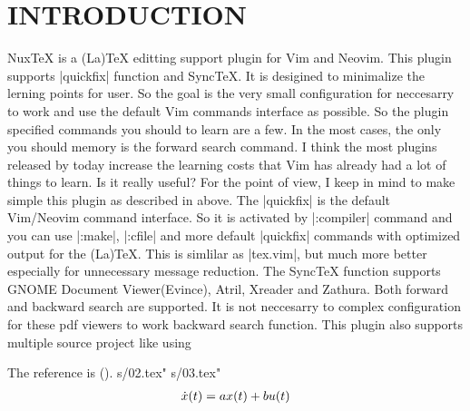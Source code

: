 \section{INTRODUCTION}

NuxTeX is a (La)TeX editting support plugin for Vim and Neovim. This plugin supports |quickfix| function and SyncTeX. It is desigined to minimalize the lerning points for user. So the goal is the very small configuration for neccesarry to work and use the default Vim commands interface as possible.  So the plugin specified commands you should to learn are a few. In the most cases, the only you should memory is the forward search command.
I think the most plugins released by today increase the learning costs that Vim has already had a lot of things to learn. Is it really useful? For the point of view, I keep in mind to make simple this plugin as described in above. The |quickfix| is the default Vim/Neovim command interface. So it is activated by |:compiler| command and you can use |:make|, |:cfile| and more default |quickfix| commands with optimized output for the (La)TeX. This is simlilar as |tex.vim|, but much more better especially for unnecessary message reduction.
The SyncTeX function supports GNOME Document Viewer(Evince), Atril, Xreader and Zathura. Both forward and backward search are supported. It is not neccesarry to complex configuration for these pdf viewers to work backward search function.
This plugin also supports multiple source project like using \

The reference is (\cite{ref1}).
 s/02.tex"
 s/03.tex"
\begin{eqnarray}
{\normalsize \dot{x}(t) = a x(t) + b u(t)}
\end{eqnarray}


